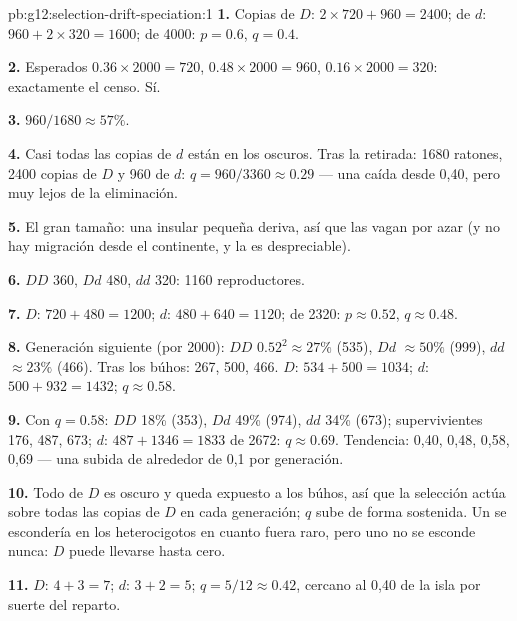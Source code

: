 \begin{solution}{pb:g12:selection-drift-speciation:1}
\textbf{1.} Copias de $D$: $2 \times 720 + 960 = 2400$; de $d$: $960 +
2 \times 320 = 1600$; de 4000: $p = 0.6$, $q = 0.4$.

\textbf{2.} Esperados $0.36 \times 2000 = 720$, $0.48 \times 2000 =
960$, $0.16 \times 2000 = 320$: exactamente el censo. Sí.

\textbf{3.} $960/1680 \approx 57\%$.

\textbf{4.} Casi todas las copias de $d$ están en los 
oscuros. Tras la retirada: 1680 ratones, 2400 copias de $D$ y 960 de
$d$: $q = 960/3360 \approx
0.29$ --- una caída desde 0,40, pero muy
lejos de la eliminación.

\textbf{5.} El gran tamaño: una  insular pequeña deriva, así
que las  vagan por azar (y no hay migración desde el
continente, y la  es despreciable).

\textbf{6.} $DD$ 360, $Dd$ 480, $dd$ 320: 1160 reproductores.

\textbf{7.} $D$: $720 + 480 = 1200$; $d$: $480 + 640 = 1120$; de 2320:
$p \approx 0.52$, $q \approx 0.48$.

\textbf{8.} Generación siguiente (por 2000): $DD$ $0.52^2 \approx 27\%$
(535), $Dd$ $\approx 50\%$ (999), $dd$ $\approx 23\%$ (466). Tras los
búhos: 267, 500, 466. $D$: $534 + 500 = 1034$; $d$: $500 + 932 =
1432$;
$q \approx 0.58$.

\textbf{9.} Con $q = 0.58$: $DD$ 18\% (353), $Dd$ 49\% (974), $dd$ 34\%
(673); supervivientes 176, 487, 673; $d$: $487 + 1346 = 1833$ de 2672:
$q \approx 0.69$. Tendencia: 0,40, 0,48, 0,58, 0,69 --- una subida de
alrededor de 0,1 por generación.

\textbf{10.} Todo  de $D$ es oscuro y queda expuesto a los
búhos, así que la selección actúa sobre todas las copias de $D$ en cada
generación; $q$ sube de forma sostenida. Un   se
escondería en los heterocigotos en cuanto fuera raro, pero uno
 no se esconde nunca: $D$ puede llevarse hasta cero.

\textbf{11.} $D$: $4 + 3 = 7$; $d$: $3 + 2 = 5$; $q = 5/12 \approx
0.42$, cercano al 0,40 de la isla por suerte del reparto.


\end{solution}
